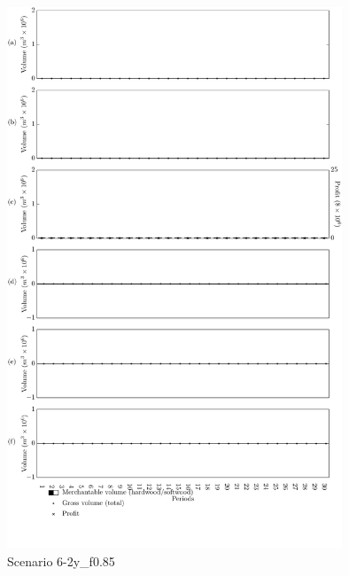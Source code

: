 \begin{figure}[h]
  \centering
  \includegraphics[width=10cm]{images/appendix/s6-2y_test085}
  \caption{Scenario 6-2y\_f0.85}
  \label{fig:s6-2y_test085}
\end{figure}




